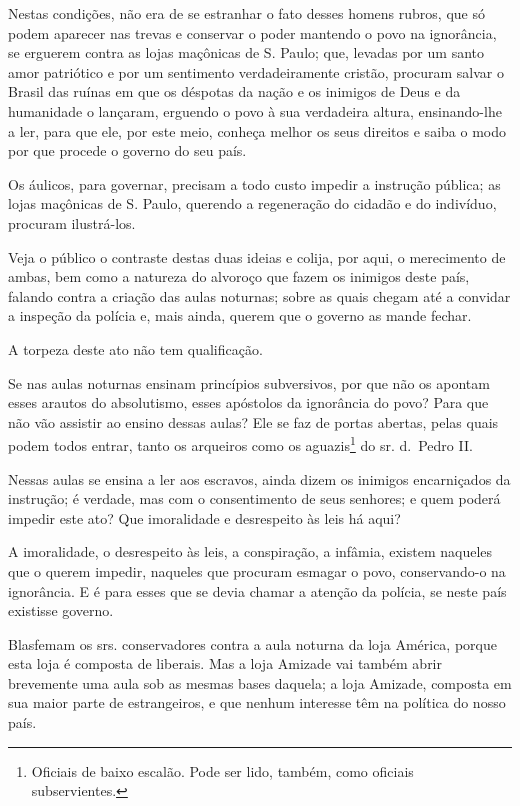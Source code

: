 Nestas condições, não era de se estranhar o fato desses homens rubros,
que só podem aparecer nas trevas e conservar o poder mantendo o povo na
ignorância, se erguerem contra as lojas maçônicas de S. Paulo; que,
levadas por um santo amor patriótico e por um sentimento verdadeiramente
cristão, procuram salvar o Brasil das ruínas em que os déspotas da nação
e os inimigos de Deus e da humanidade o lançaram, erguendo o povo à sua
verdadeira altura, ensinando-lhe a ler, para que ele, por este meio,
conheça melhor os seus direitos e saiba o modo por que procede o governo
do seu país.

Os áulicos, para governar, precisam a todo custo impedir a instrução
pública; as lojas maçônicas de S. Paulo, querendo a regeneração do
cidadão e do indivíduo, procuram ilustrá-los.

Veja o público o contraste destas duas ideias e colija, por aqui, o
merecimento de ambas, bem como a natureza do alvoroço que fazem os
inimigos deste país, falando contra a criação das aulas noturnas; sobre
as quais chegam até a convidar a inspeção da polícia e, mais ainda,
querem que o governo as mande fechar.

A torpeza deste ato não tem qualificação.

Se nas aulas noturnas ensinam princípios subversivos, por que não os
apontam esses arautos do absolutismo, esses apóstolos da ignorância do
povo? Para que não vão assistir ao ensino dessas aulas? Ele se faz de
portas abertas, pelas quais podem todos entrar, tanto os arqueiros como
os aguazis\footnote{Oficiais de baixo escalão. Pode ser lido, também,
  como oficiais subservientes.} do sr. d.~Pedro II.

Nessas aulas se ensina a ler aos escravos, ainda dizem os inimigos
encarniçados da instrução; é verdade, mas com o consentimento de seus
senhores; e quem poderá impedir este ato? Que imoralidade e desrespeito
às leis há aqui?

A imoralidade, o desrespeito às leis, a conspiração, a infâmia, existem
naqueles que o querem impedir, naqueles que procuram esmagar o povo,
conservando-o na ignorância. E é para esses que se devia chamar a
atenção da polícia, se neste país existisse governo.

Blasfemam os srs. conservadores contra a aula noturna da loja América,
porque esta loja é composta de liberais. Mas a loja Amizade vai também
abrir brevemente uma aula sob as mesmas bases daquela; a loja Amizade,
composta em sua maior parte de estrangeiros, e que nenhum interesse têm
na política do nosso país.

